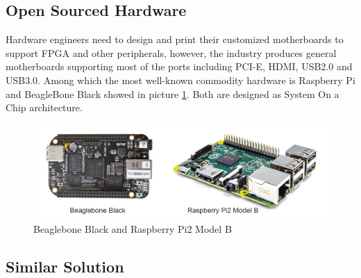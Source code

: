 \documentclass[11pt,openright,a4paper]{report}
\begin{document}
\subsection{Open Sourced Hardware}
Hardware engineers need to design and print their customized motherboards to support FPGA and other peripherals, however, the industry produces general motherboards supporting most of the ports including PCI-E, HDMI, USB2.0 and USB3.0. Among which the most well-known commodity hardware is Raspberry Pi and BeagleBone Black showed in picture \ref{fig:commodityhardware}. Both are designed as System On a Chip architecture.\\ 
\begin{figure}[H]
\centering
\includegraphics[width=0.7\linewidth]{picture/commodityhardware.jpg}
\caption{Beaglebone Black and Raspberry Pi2 Model B}
\label{fig:commodityhardware}
\end{figure}

\subsection{Similar Solution}
\end{document}
